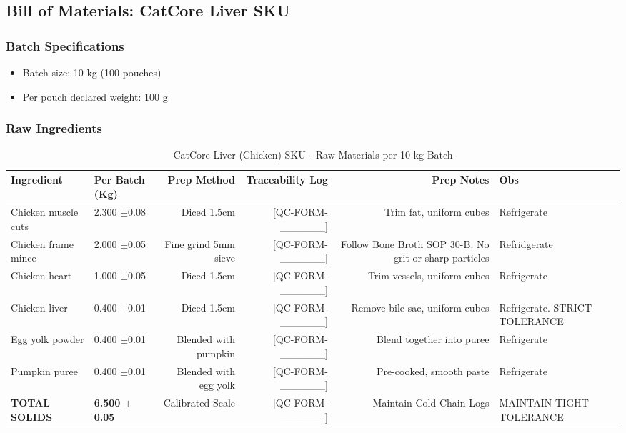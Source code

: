 \subsection*{Bill of Materials: CatCore Liver SKU}
\label{bom:catcore_heart}

\subsubsection*{Batch Specifications}
\begin{itemize}
\item Batch size: 10 kg (100 pouches)
\item Per pouch declared weight: 100 g
\end{itemize}

\subsubsection*{Raw Ingredients}
\begin{table}[h]
\centering
\caption{CatCore Liver (Chicken) SKU - Raw Materials per 10 kg Batch}
\begin{tabular}{@{}llrrrp{4cm}@{}}
\toprule
\textbf{Ingredient} & \textbf{Per Batch (Kg)} & \textbf{Prep Method}  & \textbf{Traceability Log} & \textbf{Prep Notes} & \textbf{Obs}\\
\midrule
Chicken muscle cuts & 2.300 $\pm$0.08  & Diced 1.5cm            & [QC-FORM-\_\_\_\_\_\_] & Trim fat, uniform cubes & Refrigerate\\
Chicken frame mince & 2.000 $\pm$0.05  & Fine grind 5mm sieve   & [QC-FORM-\_\_\_\_\_\_] & Follow Bone Broth SOP 30-B. No grit or sharp particles & Refridgerate  \\
Chicken heart       & 1.000 $\pm$0.05  & Diced 1.5cm            & [QC-FORM-\_\_\_\_\_\_] & Trim vessels, uniform cubes & Refrigerate\\
Chicken liver       & 0.400 $\pm$0.01  & Diced 1.5cm            & [QC-FORM-\_\_\_\_\_\_] & Remove bile sac, uniform cubes & Refrigerate. STRICT TOLERANCE\\
Egg yolk powder     & 0.400 $\pm$0.01  & Blended with pumpkin   & [QC-FORM-\_\_\_\_\_\_] & Blend together into puree & Refrigerate\\
Pumpkin puree       & 0.400 $\pm$0.01  & Blended with egg yolk  & [QC-FORM-\_\_\_\_\_\_] & Pre-cooked, smooth paste & Refrigerate\\
\midrule
\textbf{TOTAL SOLIDS} & \textbf{6.500 $\pm$0.05} & Calibrated Scale & [QC-FORM-\_\_\_\_\_\_] & Maintain Cold Chain Logs & MAINTAIN TIGHT TOLERANCE\\
\bottomrule
\end{tabular}
\end{table}

